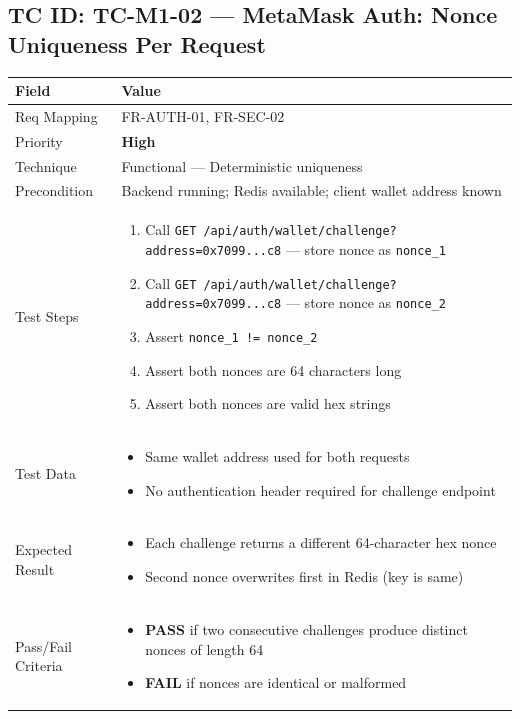 \documentclass[12pt,a4paper]{article}
\newcommand{\sevhigh}{\textcolor{severityhigh}{\textbf{High}}}
\newcommand{\passresult}{\textcolor{passgreen}{\textbf{PASS}}}
\newcommand{\failresult}{\textcolor{failred}{\textbf{FAIL}}}
\begin{document}
\vspace{0.8cm}

\subsection{TC ID: TC-M1-02 --- MetaMask Auth: Nonce Uniqueness Per Request}

\begin{tabular}{|p{}|p{}|}
\hline
\rowcolor{lightblue} \textbf{Field} & \textbf{Value} \\
\hline
Req Mapping & FR-AUTH-01, FR-SEC-02 \\
\hline
Priority & \sevhigh \\
\hline
Technique & Functional --- Deterministic uniqueness \\
\hline
Precondition & Backend running; Redis available; client wallet address known \\
\hline
Test Steps &
\begin{enumerate}[nosep, leftmargin=*]
  \item Call \texttt{GET /api/auth/wallet/challenge?address=0x7099...c8} --- store nonce as \texttt{nonce\_1}
  \item Call \texttt{GET /api/auth/wallet/challenge?address=0x7099...c8} --- store nonce as \texttt{nonce\_2}
  \item Assert \texttt{nonce\_1 != nonce\_2}
  \item Assert both nonces are 64 characters long
  \item Assert both nonces are valid hex strings
\end{enumerate} \\
\hline
Test Data &
\begin{itemize}[nosep, leftmargin=*]
  \item Same wallet address used for both requests
  \item No authentication header required for challenge endpoint
\end{itemize} \\
\hline
Expected Result &
\begin{itemize}[nosep, leftmargin=*]
  \item Each challenge returns a different 64-character hex nonce
  \item Second nonce overwrites first in Redis (key is same)
\end{itemize} \\
\hline
Pass/Fail Criteria &
\begin{itemize}[nosep, leftmargin=*]
  \item \passresult{} if two consecutive challenges produce distinct nonces of length 64
  \item \failresult{} if nonces are identical or malformed
\end{itemize} \\
\hline
\end{tabular}
\end{document}
